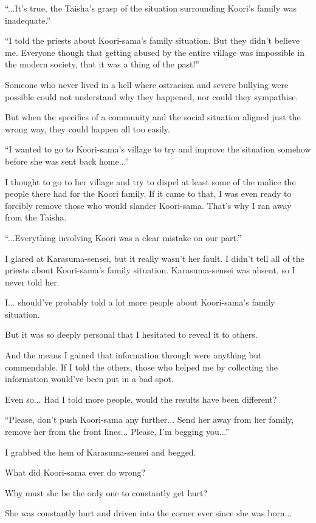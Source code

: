 ``...It's true, the Taisha's grasp of the situation surrounding Koori's family was inadequate.''

``I told the priests about Koori-sama's family situation. But they didn't believe me. Everyone though that getting abused by the entire village was impossible in the modern society, that it was a thing of the past!''

Someone who never lived in a hell where ostracism and severe bullying were possible could not understand why they happened, nor could they sympathise.

But when the specifics of a community and the social situation aligned just the wrong way, they could happen all too easily.

``I wanted to go to Koori-sama's village to try and improve the situation somehow before she was sent back home...''

I thought to go to her village and try to dispel at least some of the malice the people there had for the Koori family. If it came to that, I was even ready to forcibly remove those who would slander Koori-sama. That's why I ran away from the Taisha.

``...Everything involving Koori was a clear mistake on our part.''

I glared at Karasuma-sensei, but it really wasn't her fault. I didn't tell all of the priests about Koori-sama's family situation. Karasuma-sensei was absent, so I never told her.

I... should've probably told a lot more people about Koori-sama's family situation.

But it was so deeply personal that I hesitated to reveal it to others.

And the means I gained that information through were anything but commendable. If I told the others, those who helped me by collecting the information would've been put in a bad spot.

Even so... Had I told more people, would the results have been different?

``Please, don't push Koori-sama any further... Send her away from her family, remove her from the front lines... Please, I'm begging you...''

I grabbed the hem of Karasuma-sensei and begged.

What did Koori-sama ever do wrong?

Why must she be the only one to constantly get hurt?

She was constantly hurt and driven into the corner ever since she was born...

